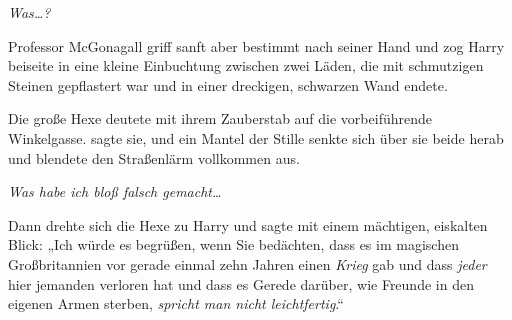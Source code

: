 \emph{Was…? }

Professor McGonagall griff sanft aber bestimmt nach seiner Hand und zog Harry beiseite in eine kleine Einbuchtung zwischen zwei Läden, die mit schmutzigen Steinen gepflastert war und in einer dreckigen, schwarzen Wand endete.

Die große Hexe deutete mit ihrem Zauberstab auf die vorbeiführende Winkelgasse.  sagte sie, und ein Mantel der Stille senkte sich über sie beide herab und blendete den Straßenlärm vollkommen aus.

\emph{Was habe ich bloß falsch gemacht…}

Dann drehte sich die Hexe zu Harry und sagte mit einem mächtigen, eiskalten Blick: „Ich würde es begrüßen, wenn Sie bedächten, dass es im magischen Großbritannien vor gerade einmal zehn Jahren einen \emph{Krieg} gab und dass \emph{jeder} hier jemanden verloren hat und dass es Gerede darüber, wie Freunde in den eigenen Armen sterben, \emph{spricht man nicht leichtfertig}.“


